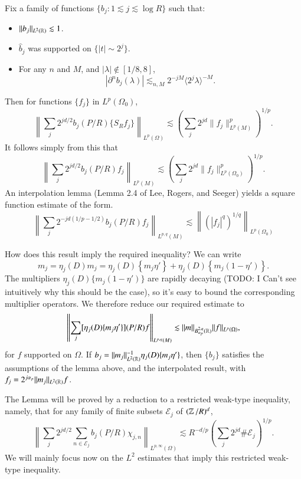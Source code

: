 \begin{lemma}
    Fix a family of functions $\{ b_j: 1 \lesssim j \lesssim \log R \}$ such that:
    \begin{itemize}
        \item $\| b_j \|_{L^2(\operatorname{\mathbb{R}})} \lesssim 1$.

        \item $\widehat{b}_j$ was supported on $\{ |t| \sim 2^j \}$.

        \item For any $n$ and $M$, and $|\lambda| \not \in [1/8, 8]$,
        \[ |\partial^n b_j(\lambda)| \lesssim_{n,M} 2^{-jM} \langle 2^j \lambda \rangle^{-M}. \]
    \end{itemize}
    Then for functions $\{ f_j \}$ in $L^p(\Omega_0)$,
    \[ \left\| \sum_j 2^{jd/2} b_j(P/R) \{ S_R f_j \} \right\|_{L^p(\Omega)} \lesssim \left( \sum_j 2^{jd} \| f_j \|_{L^p(M)}^p \right)^{1/p}. \]
    It follows simply from this that
    \[ \left\| \sum_j 2^{jd/2} b_j(P/R) f_j \right\|_{L^p(M)} \lesssim \left( \sum_j 2^{jd} \| f_j \|_{L^p(\Omega_0)}^p \right)^{1/p}. \]
    An interpolation lemma (Lemma 2.4 of Lee, Rogers, and Seeger) yields a square function estimate of the form.
    \[ \left\| \sum_j 2^{-jd(1/p - 1/2)} b_j(P/R) f_j \right\|_{L^{p,q}(M)} \lesssim \left\| \left( |f_j|^q \right)^{1/q} \right\|_{L^p(\Omega_0)} \]
\end{lemma}

How does this result imply the required inequality? We can write
%
\[ m_j = \eta_j(D) m_j = \eta_j(D) \left\{ m_j \eta' \right\} + \eta_j(D) \left\{ m_j (1 - \eta') \right\}. \]
%
The multipliers $\eta_j(D) \{ m_j (1 - \eta') \}$ are rapidly decaying (TODO: I Can't see intuitively why this should be the case), so it's easy to bound the corresponding multiplier operators. We therefore reduce our required estimate to
%
\[ \left\| \sum_j [ \eta_j(D) \{ m_j \eta' \} ](P/R) f \right\|_{L^{p,q}(M)} \lesssim \| m \|_{B^{2,q}_{\alpha_p}(\operatorname{\mathbb{R}})} \| f \|_{L^p(\Omega)}, \]
%
for $f$ supported on $\Omega$. If $b_j = \| m_j \|_{L^2(\operatorname{\mathbb{R}})}^{-1} \eta_j(D) \{ m_j \eta' \}$, then $\{ b_j \}$ satisfies the assumptions of the lemma above, and the interpolated result, with $f_j = 2^{j \alpha_p} \| m_j \|_{L^2(\operatorname{\mathbb{R}})} f$.

The Lemma will be proved by a reduction to a restricted weak-type inequality, namely, that for any family of finite subsets $\mathcal{E}_j$ of $(\operatorname{\mathbb{Z}} / R)^d$, 
%
\[ \left\| \sum_j 2^{jd/2} \sum_{n \in \mathcal{E}_j} b_j(P/R) \chi_{j,n} \right\|_{L^{p,\infty}(\Omega)} \lesssim R^{-d/p} \left( \sum_j 2^{jd} \# \mathcal{E}_j \right)^{1/p}. \]
%
We will mainly focus now on the $L^2$ estimates that imply this restricted weak-type inequality.

